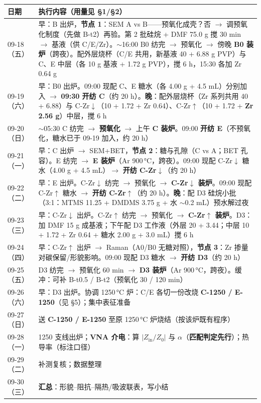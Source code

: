 \documentclass[a4paper, 10pt]{ctexart}
\begin{document}
\begin{tabular}{p{2.6cm} p{13.2cm}}
\toprule
日期 & 执行内容（用量见 §1/§2） \\
\midrule
09-18（五） & 早：B 出炉，\textbf{节点 1}：SEM A vs B——预氧化成壳？否 $\rightarrow$ 调预氧化制度（先做 B-t2）再验。第 2 批硅烷 + DMF 75.0 g 搅 30 min $\rightarrow$ 基液（供 C/E/Zr）。$\sim$16:00 B0 纺完 $\rightarrow$ 预氧化 $\rightarrow$ 傍晚 \textbf{B0 装炉}（跨夜）。配外层烧杯（C/E 共用，新基液 40 + 6.88 g PVP）与 C、E 中层（各 10 g 基液 + 1.72 g PVP），搅 6 h，15:30 各加 Zr 0.64 g \\
09-19（六） & 早：B0 出炉。09:00 现配 C、E 糖水（各 4.00 g + 4.5 mL）分别加入 $\rightarrow$ \textbf{09:30 开纺 C}（约 20 h）。\textbf{晚}：配外层烧杯（Zr 系列共用 40 + 6.88）与 C-Zr$\downarrow$（10 + 1.72 + Zr 0.64）、C-Zr$\uparrow$（10 + 1.72 + \textbf{Zr 2.56 g}）中层，搅 6 h \\
09-20（日） & $\sim$05:30 C 纺完 $\rightarrow$ \textbf{预氧化} $\rightarrow$ 上午 \textbf{C 装炉}。09:00 \textbf{开纺 E}（不预氧化，糖水已于 09-19 加入，约 20 h） \\
09-21（一） & 早：C 出炉 $\rightarrow$ SEM+BET，\textbf{节点 2}：糖与孔隙（C vs A；BET 孔容）。E 纺完 $\rightarrow$ \textbf{E 装炉}（Ar 900\,°C，跨夜）。09:00 现配 C-Zr$\downarrow$ 糖水（4.00 g + 4.5 mL）$\rightarrow$ \textbf{开纺 C-Zr$\downarrow$}（约 20 h） \\
09-22（二） & 早：E 出炉。C-Zr$\downarrow$ 纺完 $\rightarrow$ 预氧化 $\rightarrow$ \textbf{C-Zr$\downarrow$ 装炉}。09:00 现配 C-Zr$\uparrow$ 糖水 $\rightarrow$ \textbf{开纺 C-Zr$\uparrow$}（约 20 h）。\textbf{晚}：配 D3 硅烷小批（3:1：MTMS 11.25 + DMDMS 3.75 g + 水 $\sim$0.2 mL）预水解过夜 \\
09-23（三） & 早：C-Zr$\downarrow$ 出炉。C-Zr$\uparrow$ 纺完 $\rightarrow$ 预氧化 $\rightarrow$ \textbf{C-Zr$\uparrow$ 装炉}。D3：加 DMF 15 g 成基液；下午配 D3 工作液（外层 20 + 3.44；中层 10 + 1.72 + Zr 0.64 + 糖水 2.00 g + 3.0 mL）搅 6 h \\
09-24（四） & 早：C-Zr$\uparrow$ 出炉 $\rightarrow$ Raman（A0/B0 无糖对照），\textbf{节点 3}：Zr 掺量对碳保留/形貌影响。09:00 现配 D3 糖水 $\rightarrow$ \textbf{开纺 D3}（约 20 h） \\
09-25（五） & D3 纺完 $\rightarrow$ 预氧化 60 min $\rightarrow$ \textbf{D3 装炉}（Ar 900\,°C，跨夜）。缓冲：可补 B-t0.5 / B-t2（预氧化 30 / 120 min） \\
09-26（六） & 早：D3 出炉。协调 1250\,°C 炉：C/E 各切一份改烧 \textbf{C-1250 / E-1250}（见 §5）；集中表征准备 \\
09-27（日） & 送 \textbf{C-1250 / E-1250} 至原 1250\,°C 炉烧结（按该炉既有程序） \\
09-28（一） & 1250 支线出炉；\textbf{VNA 介电}：算 $|Z_{\mathrm{in}}/Z_0|$ 与 $\alpha$（\textbf{匹配判定先行}）；热导率（标注口径） \\
09-29（二） & 补测复核；数据整理 \\
09-30（三） & \textbf{汇总}：形貌--阻抗--隔热/吸波联表，写小结 \\
\bottomrule
\end{tabular}
\end{document}
